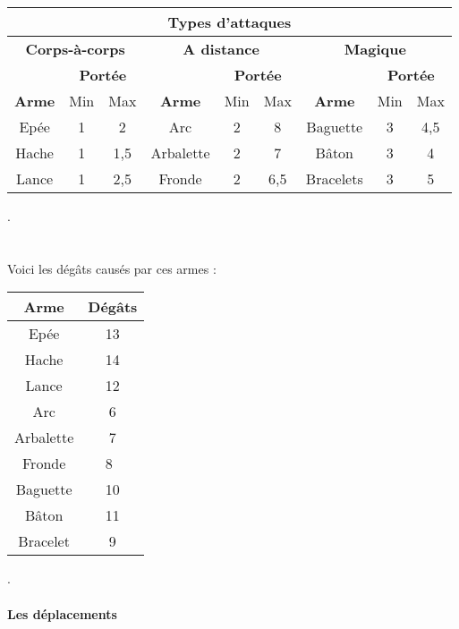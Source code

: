 \documentclass[a4paper,12pt]{report}
\begin{document}
	\begin{tabular}{|c|c|c|c|c|c|c|c|c|}
		\hline
		\multicolumn{9}{|c|}{Types d'attaques} \\
		\hline 
		\multicolumn{3}{|c|}{ \textbf{Corps-à-corps}} & 
		\multicolumn{3}{|c|}{ \textbf{A distance}}  & \multicolumn{3}{|c|}{\textbf{Magique}}\\
		\hline
		& \multicolumn{2}{|c|}{\textbf{Portée}} & & \multicolumn{2}{|c|}{\textbf{Portée}} & & \multicolumn{2}{|c|}{\textbf{Portée}} \\
		\hline
		\textbf{Arme} & Min & Max & \textbf{Arme}& Min & Max & \textbf{Arme}& Min & Max\\
		\hline 
		Epée & 1 & 2 & Arc & 2 & 8 & Baguette & 3 & 4,5 \\
		\hline
		Hache & 1 & 1,5 & Arbalette & 2 & 7 & Bâton & 3 & 4\\
		\hline
		Lance & 1 & 2,5 & Fronde & 2 & 6,5 &  Bracelets & 3 & 5 \\
		\hline

	\end{tabular}
	. \\ \\ \\
	Voici les dégâts causés par ces armes : \\ 
	\begin{center}
		\begin{tabular}{|c|c|}
			
			\hline
			Arme & Dégâts \\
			\hline
			Epée & 13 \\
			Hache & 14\\
			Lance & 12\\
			Arc & 6\\
			Arbalette & 7 \\
			Fronde & 8 \\
			Baguette & 10 \\
			Bâton & 11 \\
			Bracelet & 9 \\
			\hline
		\end{tabular}
	\end{center}
	.\\ \\
	\textbf{Les déplacements}\\
	
\end{document}
